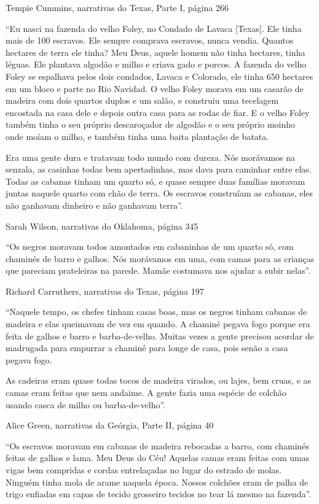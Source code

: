 Tempie Cummins, narrativas do Texas, Parte I, página 266

``Eu nasci na fazenda do velho Foley, no Condado de Lavaca {[}Texas{]}.
Ele tinha mais de 100 escravos. Ele sempre comprava escravos, nunca
vendia. Quantos hectares de terra ele tinha? Meu Deus, aquele homem não
tinha hectares, tinha léguas. Ele plantava algodão e milho e criava gado
e porcos. A fazenda do velho Foley se espalhava pelos dois condados,
Lavaca e Colorado, ele tinha 650 hectares em um bloco e parte no Rio
Navidad. O velho Foley morava em um casarão de madeira com dois quartos
duplos e um salão, e construiu uma tecelagem encostada na casa dele e
depois outra casa para as rodas de fiar. E o velho Foley também tinha o
seu próprio descaroçador de algodão e o seu próprio moinho onde moíam o
milho, e também tinha uma baita plantação de batata.

Era uma gente dura e tratavam todo mundo com dureza. Nós morávamos na
senzala, as casinhas todas bem apertadinhas, mas dava para caminhar
entre elas. Todas as cabanas tinham um quarto só, e quase sempre duas
famílias moravam juntas naquele quarto com chão de terra. Os escravos
construíam as cabanas, eles não ganhavam dinheiro e não ganhavam
terra''.

Sarah Wilson, narrativas do Oklahoma, página 345

``Os negros moravam todos amontados em cabaninhas de um quarto só, com
chaminés de barro e galhos. Nós morávamos em uma, com camas para as
crianças que pareciam prateleiras na parede. Mamãe costumava nos ajudar
a subir nelas''.

Richard Carruthers, narrativas do Texas, página 197

``Naquele tempo, os chefes tinham casas boas, mas os negros tinham
cabanas de madeira e elas queimavam de vez em quando. A chaminé pegava
fogo porque era feita de galhos e barro e barba-de-velho. Muitas vezes a
gente precisou acordar de madrugada para empurrar a chaminé para longe
de casa, pois senão a casa pegava fogo.

As cadeiras eram quase todas tocos de madeira virados, ou lajes, bem
cruas, e as camas eram feitas que nem andaime. A gente fazia uma espécie
de colchão usando casca de milho ou barba-de-velho''.

Alice Green, narrativas da Geórgia, Parte II, página 40

``Os escravos moravam em cabanas de madeira rebocadas a barro, com
chaminés feitas de galhos e lama. Meu Deus do Céu! Aquelas camas eram
feitas com umas vigas bem compridas e cordas entrelaçadas no lugar do
estrado de molas. Ninguém tinha mola de arame naquela época. Nossos
colchões eram de palha de trigo enfiadas em capas de tecido grosseiro
tecidos no tear lá mesmo na fazenda''.

